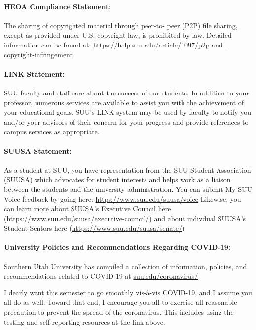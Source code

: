 \documentclass[12pt, letterpaper]{article}
\begin{document}
\paragraph{HEOA Compliance Statement:}
The sharing of copyrighted material through peer-to- peer (P2P) file sharing, except as provided under U.S. copyright law, is prohibited by law. Detailed information can be found at: \href{https://help.suu.edu/article/1097/p2p-and-copyright-infringement}{https://help.suu.edu/article/1097/p2p-and-copyright-infringement}

\paragraph{LINK Statement:}
SUU faculty and staff care about the success of our students. In addition to your professor, numerous services are available to assist you with the achievement of your educational goals. SUU's LINK system may be used by faculty to notify you and/or your advisors of their concern for your progress and provide references to campus services as appropriate.

\paragraph{SUUSA Statement:}
As a student at SUU, you have representation from the SUU Student Association (SUUSA) which advocates for student interests and helps work as a liaison between the students and the university administration. You can submit My SUU Voice feedback by going here: \href{https://www.suu.edu/suusa/voice}{https://www.suu.edu/suusa/voice} Likewise, you can learn more about SUUSA's Executive Council here (\href{https://www.suu.edu/suusa/executive-council/}{https://www.suu.edu/suusa/executive-council/}) and about indivdual SUUSA's Student Sentors here (\href{https://www.suu.edu/suusa/senate/}{https://www.suu.edu/suusa/senate/})

\paragraph{University Policies and Recommendations Regarding COVID-19:}
Southern Utah University has compiled a collection of information, policies, and recommendations related to COVID-19 at \href{https://www.suu.edu/coronavirus/}{suu.edu/coronavirus/}

\noindent I dearly want this semester to go smoothly vis-\`a-vis COVID-19, and I assume you all do as well. Toward that end, I encourage you all to exercise all reasonable precaution to prevent the spread of the coronavirus. This includes using the testing and self-reporting resources at the link above.
\end{document}
